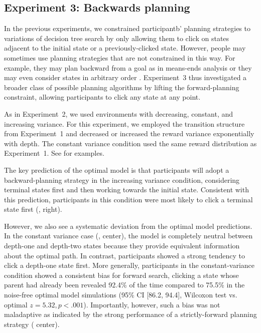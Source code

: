 \subsection{Experiment 3: Backwards planning}\label{sec:planning-results3}
In the previous experiments, we constrained participantb' planning strategies to variations of decision tree search by only allowing them to click on states adjacent to the initial state or a previously-clicked state. However, people may sometimes use planning strategies that are not constrained in this way. For example, they may plan backward from a goal as in means-ends analysis \citep{newell1972human} or they may even consider states in arbitrary order \citep{sutton1990integrated}. Experiment~3 thus investigated a broader class of possible planning algorithms by lifting the forward-planning constraint, allowing participants to click any state at any point.

As in Experiment~2, we used environments with decreasing, constant, and increasing variance. For this experiment, we employed the transition structure from Experiment~1 and decreased or increased the reward variance exponentially with depth. The constant variance condition used the same reward distribution as Experiment~1. See  for examples.

The key prediction of the optimal model is that participants will adopt a backward-planning strategy in the increasing variance condition, considering terminal states first and then working towards the initial state. Consistent with this prediction, participants in this condition were most likely to click a terminal state first (, right).

However, we also see a systematic deviation from the optimal model predictions. In the constant variance case (, center), the model is completely neutral between depth-one and depth-two states because they provide equivalent information about the optimal path. In contrast, participants showed a strong tendency to click a depth-one state first. More generally, participants in the constant-variance condition showed a consistent bias for forward search, clicking a state whose parent had already been revealed 92.4\% of the time compared to 75.5\% in the noise-free optimal model simulations (95\% CI [86.2, 94.4], Wilcoxon test vs. optimal $z = 5.32, p < .001$). Importantly, however, such a bias was not maladaptive as indicated by the strong performance of a strictly-forward planning strategy ( center).

